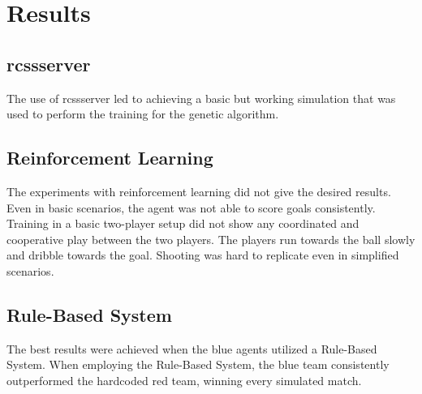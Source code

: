 \section{Results}
\label{section:results}

\subsection{rcssserver}
The use of rcssserver led to achieving a basic but working simulation that was used to perform the training for the genetic algorithm.

\subsection{Reinforcement Learning}
The experiments with reinforcement learning did not give the desired results.  
Even in basic scenarios, the agent was not able to score goals consistently.  
Training in a basic two-player setup did not show any coordinated and cooperative play between the two players.  
The players run towards the ball slowly and dribble towards the goal.  
Shooting was hard to replicate even in simplified scenarios.  

\subsection{Rule-Based System}
The best results were achieved when the blue agents utilized a Rule-Based System. When employing the Rule-Based System, 
the blue team consistently outperformed the hardcoded red team, winning every simulated match.
